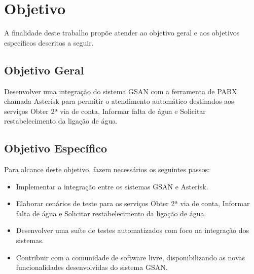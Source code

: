 \section*{Objetivo}

A finalidade deste trabalho propõe atender ao objetivo geral e aos objetivos específicos descritos a seguir.

\subsection*{Objetivo Geral}

Desenvolver uma integração do sistema GSAN com a ferramenta de PABX chamada Asterisk para permitir o atendimento automático destinados aos serviços Obter 2ª via de conta, Informar falta de água e Solicitar restabelecimento da ligação de água.

\subsection*{Objetivo Específico}
Para alcance deste objetivo, fazem necessários os seguintes passos:
\begin{itemize}
	\item Implementar a integração entre os sistemas GSAN e Asterisk.
	\item Elaborar cenários de teste para os serviços Obter 2ª via de conta, Informar falta de água e Solicitar restabelecimento da ligação de água.
	\item Desenvolver uma suíte de testes automatizados com foco na integração dos sistemas. 
	\item Contribuir com a comunidade de software livre, disponibilizando as novas funcionalidades desenvolvidas do sistema GSAN.
\end{itemize}